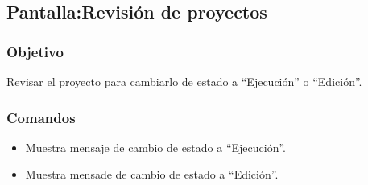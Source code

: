 \subsection{Pantalla:Revisión de proyectos}
\subsubsection{Objetivo}
Revisar el proyecto para cambiarlo de estado a ``Ejecución'' o ``Edición''.



\subsubsection{Comandos}
\begin{itemize}
 \item {} Muestra mensaje de cambio de estado a ``Ejecución''.
 \item {} Muestra mensade de cambio de estado a ``Edición''.

\end{itemize}


